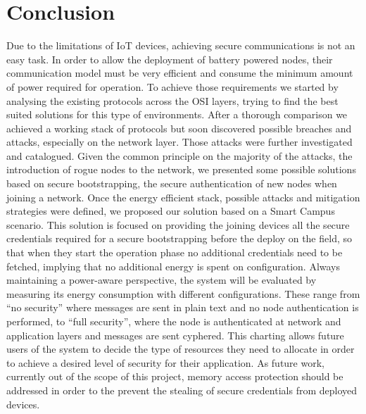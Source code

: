 
\chapter{Conclusion}
\label{chapter:conclusion}
Due to the limitations of \gls{IoT} devices, achieving secure communications is not an easy task. In order to allow the deployment of battery powered nodes, their communication model must be very efficient and consume the minimum amount of power required for operation. To achieve those requirements we started by analysing the existing protocols across the OSI layers, trying to find the best suited solutions for this type of environments. After a thorough comparison we achieved a working stack of protocols but soon discovered possible breaches and attacks, especially on the network layer. Those attacks were further investigated and catalogued. Given the common principle on the majority of the attacks, the introduction of rogue nodes to the network, we presented some possible solutions based on secure bootstrapping, the secure authentication of new nodes when joining a network.
Once the energy efficient stack, possible attacks and mitigation strategies were defined, we proposed our solution based on a Smart Campus scenario. This solution is focused on providing the joining devices all the secure credentials required for a secure bootstrapping before the deploy on the field, so that when they start the operation phase no additional credentials need to be fetched, implying that no additional energy is spent on configuration.
Always maintaining a power-aware perspective, the system will be evaluated by measuring its energy consumption with different configurations. These range from ``no security'' where messages are sent in plain text and no node authentication is performed, to ``full security'', where the node is authenticated at network and application layers and messages are sent cyphered. This charting allows future users of the system to decide the type of resources they need to allocate in order to achieve a desired level of security for their application. As future work, currently out of the scope of this project, memory access protection should be addressed in order to the prevent the stealing of secure credentials from deployed devices.
